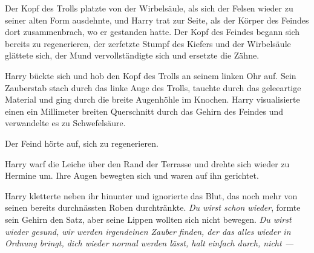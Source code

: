 

Der Kopf des Trolls platzte von der Wirbelsäule, als sich der Felsen wieder zu seiner alten Form ausdehnte, und Harry trat zur Seite, als der Körper des Feindes dort zusammenbrach, wo er gestanden hatte. Der Kopf des Feindes begann sich bereits zu regenerieren, der zerfetzte Stumpf des Kiefers und der Wirbelsäule glättete sich, der Mund vervollständigte sich und ersetzte die Zähne.

Harry bückte sich und hob den Kopf des Trolls an seinem linken Ohr auf. Sein Zauberstab stach durch das linke Auge des Trolls, tauchte durch das geleeartige Material und ging durch die breite Augenhöhle im Knochen. Harry visualisierte einen ein Millimeter breiten Querschnitt durch das Gehirn des Feindes und verwandelte es zu Schwefelsäure.

Der Feind hörte auf, sich zu regenerieren.


Harry warf die Leiche über den Rand der Terrasse und drehte sich wieder zu Hermine um. Ihre Augen bewegten sich und waren auf ihn gerichtet.

Harry kletterte neben ihr hinunter und ignorierte das Blut, das noch mehr von seinen bereits durchnässten Roben durchtränkte.
\emph{Du wirst schon wieder}, formte sein Gehirn den Satz, aber seine Lippen wollten sich nicht bewegen. \emph{Du wirst wieder gesund, wir werden irgendeinen Zauber finden, der das alles wieder in Ordnung bringt, dich wieder normal werden lässt, halt einfach durch, nicht —}

